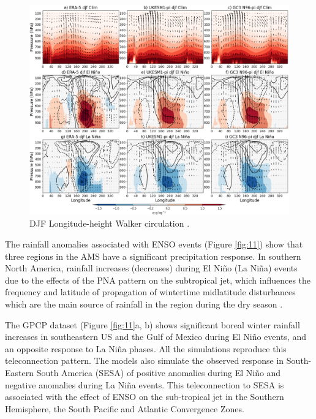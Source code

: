 \begin{figure}
\includegraphics[width=\linewidth]{figures/walkerfinal}
\caption[Walker circulation anomalies associated with ENSO]{DJF Longitude-height Walker circulation .}
\label{fig:swalker}
\end{figure}


The rainfall anomalies associated with ENSO events (Figure \ref{fig:11}) show that three regions in the AMS have a significant precipitation response.
In southern North America, rainfall increases (decreases) during El Ni\~no (La Ni\~na) events due to the effects of the PNA pattern on the subtropical jet, which influences the frequency and latitude of propagation of wintertime midlatitude disturbances which are the main source of rainfall in the region during the dry season \citep{vera2006,bayr2019}.

The GPCP dataset (Figure \ref{fig:11}a, b) shows significant boreal winter rainfall increases in southeastern US and the Gulf of Mexico during El Ni\~no events, and an opposite response to La Ni\~na phases. All the simulations reproduce this teleconnection pattern. 
The models also simulate the observed response in South-Eastern South America (SESA) of positive anomalies during El Ni\~no and negative anomalies during La Ni\~na events. This teleconnection to SESA is associated with the effect of ENSO on the sub-tropical jet in the Southern Hemisphere, the South Pacific and Atlantic Convergence Zones.

